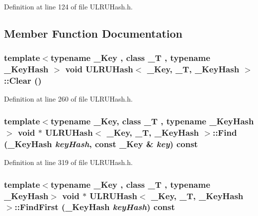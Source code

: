 Definition at line 124 of file ULRUHash.h.

\subsection{Member Function Documentation}
\hypertarget{class_u_l_r_u_hash_180a90b26ca19f3e6cba92080fd88f40}{
\subsubsection[{Clear}]{\setlength{\rightskip}{0pt plus 5cm}template$<$typename \_\-Key , class \_\-T , typename \_\-KeyHash $>$ void {\bf ULRUHash}$<$ \_\-Key, \_\-T, \_\-KeyHash $>$::Clear ()}}
\label{class_u_l_r_u_hash_180a90b26ca19f3e6cba92080fd88f40}




Definition at line 260 of file ULRUHash.h.\hypertarget{class_u_l_r_u_hash_90f2e020b3aad0abebf75c84de57cfbc}{
\subsubsection[{Find}]{\setlength{\rightskip}{0pt plus 5cm}template$<$typename \_\-Key, class \_\-T , typename \_\-KeyHash$>$ void $\ast$ {\bf ULRUHash}$<$ \_\-Key, \_\-T, \_\-KeyHash $>$::Find (\_\-KeyHash {\em keyHash}, \/  const \_\-Key \& {\em key}) const}}
\label{class_u_l_r_u_hash_90f2e020b3aad0abebf75c84de57cfbc}




Definition at line 319 of file ULRUHash.h.\hypertarget{class_u_l_r_u_hash_6853ac9489e5fa1192f0ed080b149b1f}{
\subsubsection[{FindFirst}]{\setlength{\rightskip}{0pt plus 5cm}template$<$typename \_\-Key , class \_\-T , typename \_\-KeyHash$>$ void $\ast$ {\bf ULRUHash}$<$ \_\-Key, \_\-T, \_\-KeyHash $>$::FindFirst (\_\-KeyHash {\em keyHash}) const}}
\label{class_u_l_r_u_hash_6853ac9489e5fa1192f0ed080b149b1f}




